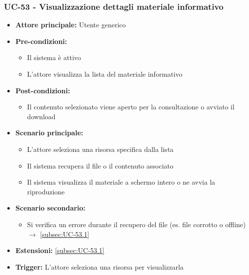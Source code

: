 \documentclass[a4paper,12pt]{article}
\begin{document}
\subsubsection{UC-53 - Visualizzazione dettagli materiale informativo} \label{sec:UC-53}
\begin{itemize}
    \item \textbf{Attore principale:} Utente generico
    \item \textbf{Pre-condizioni:}
    \begin{itemize}
        \item Il sistema è attivo
        \item L'attore visualizza la lista del materiale informativo
    \end{itemize}
    \item \textbf{Post-condizioni:}
    \begin{itemize}
        \item Il contenuto selezionato viene aperto per la consultazione o avviato il download
    \end{itemize}
    \item \textbf{Scenario principale:} 
    \begin{itemize}
        \item L'attore seleziona una risorsa specifica dalla lista
        \item Il sistema recupera il file o il contenuto associato
        \item Il sistema visualizza il materiale a schermo intero o ne avvia la riproduzione
    \end{itemize}
    \item \textbf{Scenario secondario:} 
    \begin{itemize}
         \item Si verifica un errore durante il recupero del file (es. file corrotto o offline) $\rightarrow$ \ref{subsec:UC-53.1}
    \end{itemize}
    \item \textbf{Estensioni:} \ref{subsec:UC-53.1}
    \item \textbf{Trigger:} L'attore seleziona una risorsa per visualizzarla
\end{itemize}
\end{document}

